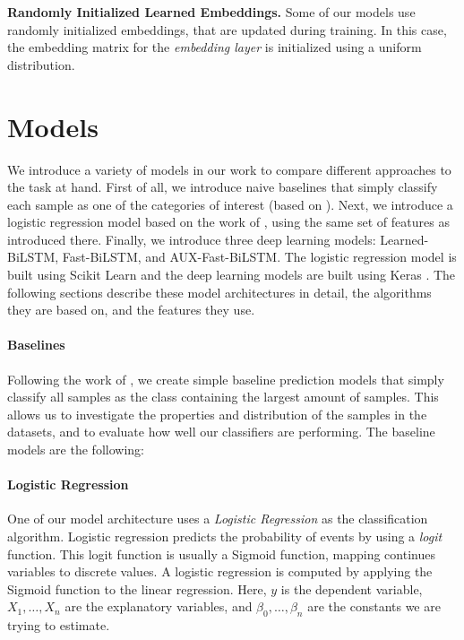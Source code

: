 \documentclass{article}
\begin{document}
\textbf{Randomly Initialized Learned Embeddings.} Some of our models use randomly initialized embeddings, that are updated during training. In this case, the embedding matrix for the \textit{embedding layer} is initialized using a uniform distribution.

\section{Models}\label{sec:models}
We introduce a variety of models in our work to compare different approaches to the task at hand. First of all, we introduce naive baselines that simply classify each sample as one of the categories of interest (based on \cite{zampieri2019predicting}). Next, we introduce a logistic regression model based on the work of \cite{davidson2017automated}, using the same set of features as introduced there. Finally, we introduce three deep learning models: Learned-BiLSTM, Fast-BiLSTM, and AUX-Fast-BiLSTM. The logistic regression model is built using Scikit Learn \cite{pedregosa2011scikit} and the deep learning models are built using Keras \cite{chollet2015keras}. The following sections describe these model architectures in detail, the algorithms they are based on, and the features they use.


\paragraph{Baselines}\label{ssec:baselines}
Following the work of \cite{zampieri2019predicting}, we create simple baseline prediction models that simply classify all samples as the class containing the largest amount of samples. This allows us to investigate the properties and distribution of the samples in the datasets, and to evaluate how well our classifiers are performing. The baseline models are the following:

\paragraph{Logistic Regression}
One of our model architecture uses a \textit{Logistic Regression} as the classification algorithm. Logistic regression predicts the probability of events by using a \textit{logit} function. This logit function is usually a Sigmoid function, mapping continues variables to discrete values. A logistic regression  is computed by applying the Sigmoid function to the linear regression. Here, $y$ is the dependent variable, $X_1, \dots, X_n$ are the explanatory variables, and $\beta_0, \dots, \beta_n$ are the constants we are trying to estimate.
\end{document}
